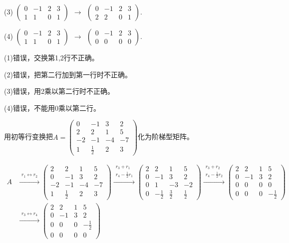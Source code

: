 \documentclass[a4paper]{report}
\begin{document}
(3)
$
\begin{pmatrix}
0&-1&2&3\\ 1&1 &0&1
\end{pmatrix}~~\rightarrow~~
\begin{pmatrix}
0&-1&2&3\\ 2&2 &0&1
\end{pmatrix}
$.

(4)
$
\begin{pmatrix}
0&-1&2&3\\ 1&1 &0&1
\end{pmatrix}~~\rightarrow~~
\begin{pmatrix}
0&-1&2&3\\ 0&0 &0&0
\end{pmatrix}
$.

\begin{jie}
(1)错误，交换第1,2行不正确。

(2)错误，把第二行加到第一行时不正确。

(3)错误，用2乘以第二行时不正确。

(4)错误，不能用0乘以第二行。
\end{jie}

\EX 用初等行变换把$
A=
\begin{pmatrix}
0&-1&3&2\\
2&2&1&5\\
-2&-1&-4&-7\\
1&\frac{1}{2}&2&3
\end{pmatrix}
$化为阶梯型矩阵。

\begin{jie}
\begin{align*}
A&\xrightarrow{\substack{r_{1}\leftrightarrow r_{2}}}
{
\begin{pmatrix}
2&2&1&5\\
0&-1&3&2\\
-2&-1&-4&-7\\
1&\frac{1}{2}&2&3
\end{pmatrix}
}
\xrightarrow{\substack{r_{3}+r_{1}\\ r_{4}-\frac{1}{2}r_{1}}}
{
\begin{pmatrix}
2&2&1&5\\
0&-1&3&2\\
0&1&-3&-2\\
0&-\frac{1}{2}&\frac{3}{2}&\frac{1}{2}
\end{pmatrix}
}\xrightarrow{\substack{r_{3}+r_{2}\\ r_{4}-\frac{1}{2}r_{2}}}
{
\begin{pmatrix}
2&2&1&5\\
0&-1&3&2\\
0&0&0&0\\
0&0&0&-\frac{1}{2}
\end{pmatrix}
}\\
&\xrightarrow{\substack{r_{3}\leftrightarrow r_{4}}}
{
\begin{pmatrix}
2&2&1&5\\
0&-1&3&2\\
0&0&0&-\frac{1}{2}\\
0&0&0&0
\end{pmatrix}
}\end{align*}
\end{jie}
\end{document}
